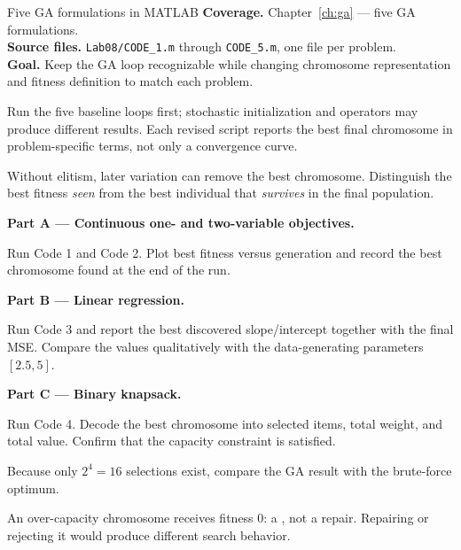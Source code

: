 
\begin{labproject}{Five GA formulations in MATLAB}
\textbf{Coverage.} Chapter~\ref{ch:ga} --- five GA formulations.\\
\textbf{Source files.} \texttt{Lab08/CODE\_1.m} through \texttt{CODE\_5.m}, one file per problem.\\
\textbf{Goal.} Keep the GA loop recognizable while changing chromosome representation and fitness definition to match each problem.

\begin{labmode}
Run the five baseline loops first; stochastic initialization and operators may produce different results. Each revised script reports the best final chromosome in problem-specific terms, not only a convergence curve.
\end{labmode}

\begin{pitfall}
Without elitism, later variation can remove the best chromosome. Distinguish the best fitness \emph{seen} from the best individual that \emph{survives} in the final population.
\end{pitfall}

\medskip\noindent\textbf{Part A --- Continuous one- and two-variable objectives.}\par
Run Code 1 and Code 2. Plot best fitness versus generation and record the best chromosome found at the end of the run.

\medskip\noindent\textbf{Part B --- Linear regression.}\par
Run Code 3 and report the best discovered slope/intercept together with the final MSE. Compare the values qualitatively with the data-generating parameters \([2.5,5]\).

\medskip\noindent\textbf{Part C --- Binary knapsack.}\par
Run Code 4. Decode the best chromosome into selected items, total weight, and total value. Confirm that the capacity constraint is satisfied.

Because only $2^4=16$ selections exist, compare the GA result with the brute-force optimum.

\begin{keyidea}
An over-capacity chromosome receives fitness 0: a , not a repair. Repairing or rejecting it would produce different search behavior.
\end{keyidea}


\end{labproject}
